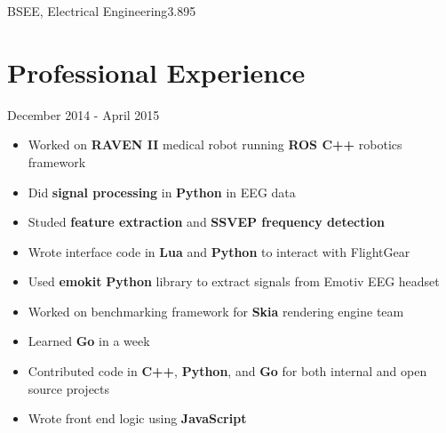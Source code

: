 \documentclass{my_resume}
\begin{document}

	{BSEE, Electrical Engineering}{3.895}

\section{Professional Experience}
	{December 2014 - April 2015}
\begin{itemize}
	\item Worked on \textbf{RAVEN II} medical robot running \textbf{ROS C++}
		robotics framework
	\item Did \textbf{signal processing} in \textbf{Python} in EEG data
	\item Studed \textbf{feature extraction} and \textbf{SSVEP frequency detection}
	\item Wrote interface code in \textbf{Lua} and \textbf{Python} to interact
		with FlightGear
	\item Used \textbf{emokit} \textbf{Python} library to extract signals from
		Emotiv EEG headset
\end{itemize}
\begin{itemize}
	\item Worked on benchmarking framework for \textbf{Skia} rendering engine team
	\item Learned \textbf{Go} in a week
	\item Contributed code in \textbf{C++}, \textbf{Python}, and \textbf{Go} for
		both internal and open source projects
	\item Wrote front end logic using \textbf{JavaScript}
\end{itemize}
\end{document}
